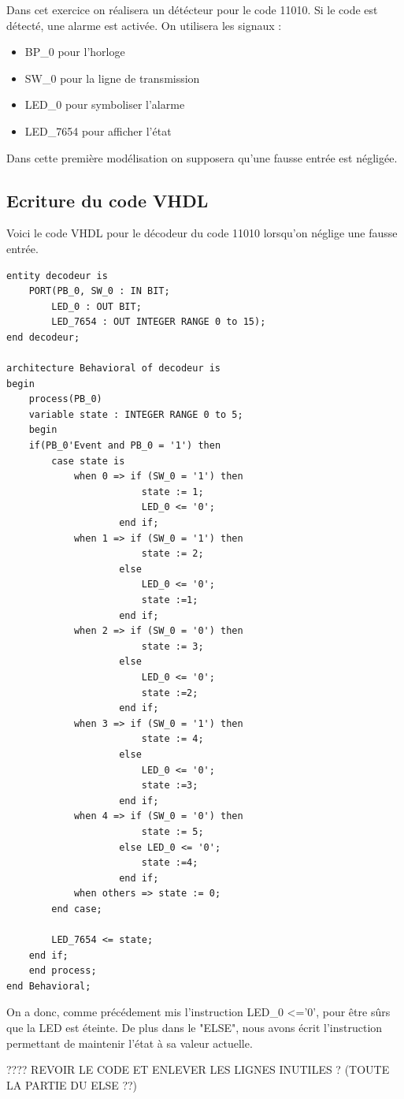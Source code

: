 \documentclass[11pt]{report}
\begin{document}
Dans cet exercice on réalisera un détécteur pour le code 11010. Si le code est détecté, une alarme est activée. On utilisera les signaux :
\begin{itemize}
	\item BP\_0 pour l'horloge
	\item SW\_0 pour la ligne de transmission
	\item LED\_0 pour symboliser l'alarme
	\item LED\_7654 pour afficher l'état

\end{itemize}

Dans cette première modélisation on supposera qu'une fausse entrée est négligée. 

\subsection{Ecriture du code VHDL}

Voici le code VHDL pour le décodeur du code 11010 lorsqu'on néglige une fausse entrée.

\begin{lstlisting}
entity decodeur is
	PORT(PB_0, SW_0 : IN BIT;
		LED_0 : OUT BIT;
		LED_7654 : OUT INTEGER RANGE 0 to 15);
end decodeur;

architecture Behavioral of decodeur is
begin
	process(PB_0)
	variable state : INTEGER RANGE 0 to 5;
	begin
	if(PB_0'Event and PB_0 = '1') then
		case state is
			when 0 => if (SW_0 = '1') then 
						state := 1; 
						LED_0 <= '0'; 
					end if;	
			when 1 => if (SW_0 = '1') then 
						state := 2; 
					else 
						LED_0 <= '0'; 
						state :=1; 
					end if;
			when 2 => if (SW_0 = '0') then 
						state := 3; 
					else 
						LED_0 <= '0';
						state :=2; 
					end if;
			when 3 => if (SW_0 = '1') then 
						state := 4; 
					else
						LED_0 <= '0'; 
  						state :=3; 
					end if;
			when 4 => if (SW_0 = '0') then 
						state := 5; 
					else LED_0 <= '0'; 
						state :=4;
					end if;
			when others => state := 0;
		end case;
	
		LED_7654 <= state;
	end if;
	end process;
end Behavioral;

\end{lstlisting}

On a donc, comme précédement mis l'instruction LED\_0 <='0', pour être sûrs que la LED est éteinte. De plus dans le "ELSE", nous avons écrit l'instruction permettant de maintenir l'état à sa valeur actuelle. 


???? REVOIR LE CODE ET ENLEVER LES LIGNES INUTILES ? (TOUTE LA PARTIE DU ELSE ??)
\end{document}
